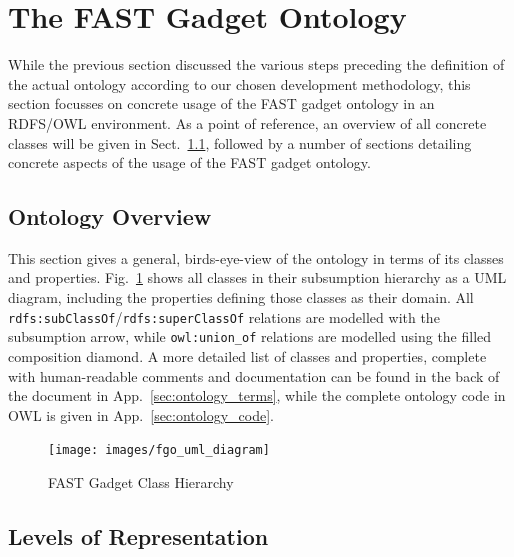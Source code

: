 \documentclass{article}
\begin{document}
%
%
%
\clearpage
\section{The FAST Gadget Ontology} %
\label{sec:ontology}

While the previous section discussed the various steps preceding the definition of the actual ontology according to our chosen development methodology, this section focusses on concrete usage of the FAST gadget ontology in an RDFS/OWL environment. As a point of reference, an overview of all concrete classes will be given in Sect.~\ref{sub:ontology_overview}, followed by a number of sections detailing concrete aspects of the usage of the FAST gadget ontology.

\subsection{Ontology Overview} %
\label{sub:ontology_overview}

This section gives a general, birds-eye-view of the ontology in terms of its classes and properties. Fig.~\ref{fig:ontology_uml} shows all classes in their subsumption hierarchy as a UML diagram, including the properties defining those classes as their domain. All \texttt{rdfs:subClassOf}/\texttt{rdfs:superClassOf} relations are modelled with the subsumption arrow, while \texttt{owl:union\_of} relations are modelled using the filled composition diamond.
A more detailed list of classes and properties, complete with human-readable comments and documentation can be found in the back of the document in App.~\ref{sec:ontology_terms}, while the complete ontology code in OWL is given in App.~\ref{sec:ontology_code}.

\begin{figure}
  \begin{center}
    \texttt{[image: images/fgo\_uml\_diagram]}
    \caption{FAST Gadget Class Hierarchy}
    \label{fig:ontology_uml}
  \end{center}
\end{figure}



\subsection{Levels of Representation} %
\label{sub:classes_instances_and_templates}
\end{document}
